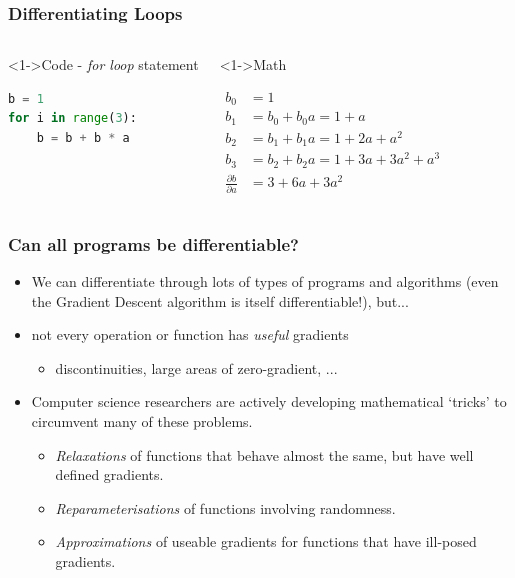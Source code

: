 \documentclass[\beamerclass]{beamer}
\begin{document}
\begin{frame}[fragile]
\frametitle{Differentiating Loops}
\begin{columns}
    \begin{block}<1->{Code - \emph{for loop} statement}
    \begin{minipage}[c][3.5cm][c]{\linewidth} 
\begin{lstlisting}[language=python]
b = 1
for i in range(3):
    b = b + b * a
\end{lstlisting}
	\end{minipage}
    \end{block}

	\begin{block}<1->{Math}
	\begin{minipage}[c][3.5cm][c]{\linewidth}\vspace{-0.75cm}%
	\begin{align*}
	b_0 &= 1 \\
	b_1 &= b_0 + b_0 a = 1 + a \\
	b_2 &= b_1 + b_1 a = 1 + 2a + a^2 \\
	b_3 &= b_2 + b_2 a = 1 + 3a + 3a^2 + a^3 \\
	\frac{\partial b}{\partial a} &= 3 + 6a + 3a^2
	\end{align*}
   \end{minipage}
	\end{block}
\end{columns}
\end{frame}



\begin{frame}
\frametitle{Can all programs be differentiable?}

\begin{itemize}
	\item<+-> We can differentiate through lots of types of programs and algorithms (even the Gradient Descent algorithm is itself differentiable!), but...
	\item<+-> not every operation or function has \emph{useful} gradients
	\begin{itemize}
		\item<+-> discontinuities, large areas of zero-gradient, ...
	\end{itemize}
	\item<+-> Computer science researchers are actively developing mathematical `tricks' to circumvent many of these problems.
	\begin{itemize}
		\item \emph{Relaxations} of functions that behave almost the same, but have well defined gradients.
		\item \emph{Reparameterisations} of functions involving randomness.
		\item \emph{Approximations} of useable gradients for functions that have ill-posed gradients.
	\end{itemize}
\end{itemize}
\end{frame}
\end{document}
